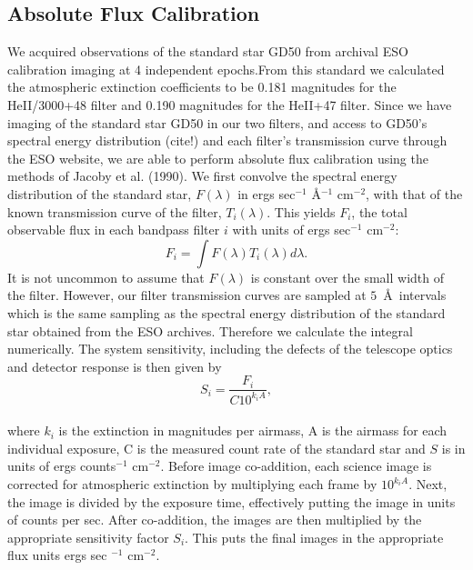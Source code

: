 \documentclass[twocolumn]{aastex61}
\begin{document}
\subsection{Absolute Flux Calibration}
We acquired observations of the standard star GD50 from archival ESO calibration imaging at 4 independent epochs.From this standard we calculated the atmospheric extinction coefficients to be 0.181 magnitudes for the HeII/3000+48 filter and 0.190 magnitudes for the HeII+47 filter. Since we have imaging of the standard star GD50 in our two filters, and access to GD50's spectral energy distribution (cite!) and each filter's transmission curve through the ESO website, we are able to perform absolute flux calibration using the methods of Jacoby et al. (1990). We first convolve the spectral energy distribution of the standard star, $F(\lambda)$ in ergs sec$^{-1}$ \AA$^{-1}$ cm$^{-2}$, with that of the known transmission curve of the filter, $T_{i}(\lambda)$. This yields $F_i$, the total observable flux in each bandpass filter $i$ with units of ergs sec$^{-1}$ cm$^{-2}$:
\begin{equation*}
F_{i}=\int F(\lambda)T_{i}(\lambda)d\lambda.
\end{equation*}
It is not uncommon to assume that $F(\lambda)$ is constant over the small width of the filter. However, our filter transmission curves are sampled at $5$\ \AA\ intervals which is the same sampling as the spectral energy distribution of the standard star obtained from the ESO archives. Therefore we calculate the integral numerically.
The system sensitivity, including the defects of the telescope optics and detector response is then given by
\begin{equation*}
S_{i}=\dfrac{F_{i}}{C10^{k_{i}A}},
\end{equation*}\\
where $k_i$ is the extinction in magnitudes per airmass, A is the airmass for each individual exposure, C is the measured count rate of the standard star and $S$ is in units of ergs counts$^{-1}$ cm$^{-2}$. Before image co-addition, each science image is corrected for atmospheric extinction by multiplying each frame by $10^{k_{i}A}$. Next, the image is divided by the exposure time, effectively putting the image in units of counts per sec. After co-addition, the images are then multiplied by the appropriate sensitivity factor $S_{i}$. This puts the final images in the appropriate flux units ergs sec $^{-1}$ cm$^{-2}$.
\end{document}

